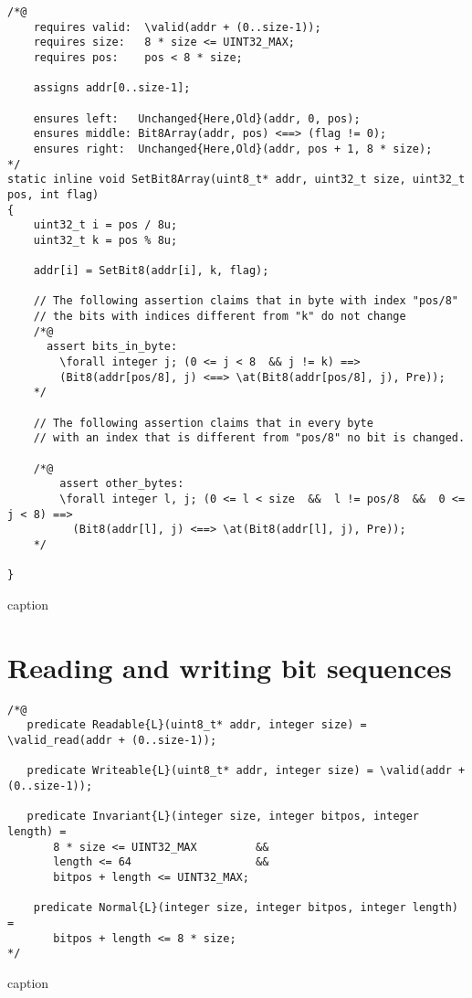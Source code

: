 \begin{listing}[hbt]
\begin{minipage}{0.99\textwidth}
\begin{lstlisting}[style=acsl-block]
/*@
    requires valid:  \valid(addr + (0..size-1));
    requires size:   8 * size <= UINT32_MAX;
    requires pos:    pos < 8 * size;

    assigns addr[0..size-1];

    ensures left:   Unchanged{Here,Old}(addr, 0, pos);
    ensures middle: Bit8Array(addr, pos) <==> (flag != 0);
    ensures right:  Unchanged{Here,Old}(addr, pos + 1, 8 * size);
*/
static inline void SetBit8Array(uint8_t* addr, uint32_t size, uint32_t pos, int flag)
{
    uint32_t i = pos / 8u;
    uint32_t k = pos % 8u;

    addr[i] = SetBit8(addr[i], k, flag);

    // The following assertion claims that in byte with index "pos/8"
    // the bits with indices different from "k" do not change
    /*@
      assert bits_in_byte:
        \forall integer j; (0 <= j < 8  && j != k) ==>
        (Bit8(addr[pos/8], j) <==> \at(Bit8(addr[pos/8], j), Pre));
    */

    // The following assertion claims that in every byte
    // with an index that is different from "pos/8" no bit is changed.

    /*@
        assert other_bytes:
        \forall integer l, j; (0 <= l < size  &&  l != pos/8  &&  0 <= j < 8) ==>
          (Bit8(addr[l], j) <==> \at(Bit8(addr[l], j), Pre));
    */

}
\end{lstlisting}
\end{minipage}
\caption{caption}
\end{listing}

\FloatBarrier


\section{Reading and writing bit sequences}


\begin{listing}[hbt]
\begin{minipage}{0.99\textwidth}
\begin{lstlisting}[style=acsl-block]
/*@
   predicate Readable{L}(uint8_t* addr, integer size) = \valid_read(addr + (0..size-1));

   predicate Writeable{L}(uint8_t* addr, integer size) = \valid(addr + (0..size-1));

   predicate Invariant{L}(integer size, integer bitpos, integer length) =
       8 * size <= UINT32_MAX         &&
       length <= 64                   &&
       bitpos + length <= UINT32_MAX;

    predicate Normal{L}(integer size, integer bitpos, integer length) =
       bitpos + length <= 8 * size;
*/
\end{lstlisting}
\end{minipage}
\caption{caption}
\end{listing}



